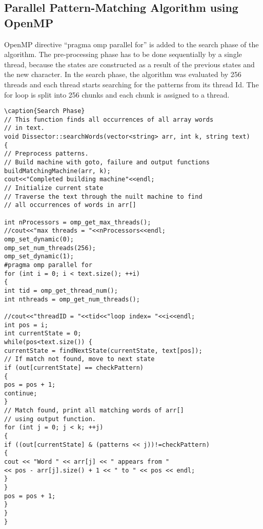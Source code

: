 \subsection{Parallel Pattern-Matching Algorithm using OpenMP}
OpenMP directive “pragma omp parallel for” is added to the search phase of the algorithm. The pre-processing phase has to be done sequentially by a single thread, because the states are constructed as a result of the previous states and the new character. In the search phase, the algorithm was evaluated by 256 threads and each thread starts searching for the patterns from its thread Id. The for loop is split into 256 chunks and each chunk is assigned to a thread. 

\begin{lstlisting}
\caption{Search Phase}
// This function finds all occurrences of all array words
// in text.
void Dissector::searchWords(vector<string> arr, int k, string text)
{
// Preprocess patterns.
// Build machine with goto, failure and output functions
buildMatchingMachine(arr, k);
cout<<"Completed building machine"<<endl;
// Initialize current state
// Traverse the text through the nuilt machine to find
// all occurrences of words in arr[]

int nProcessors = omp_get_max_threads();
//cout<<"max threads = "<<nProcessors<<endl;
omp_set_dynamic(0);
omp_set_num_threads(256);
omp_set_dynamic(1);	
#pragma omp parallel for	
for (int i = 0; i < text.size(); ++i)
{
int tid = omp_get_thread_num();
int nthreads = omp_get_num_threads();

//cout<<"threadID = "<<tid<<"loop index= "<<i<<endl;
int pos = i;
int currentState = 0;
while(pos<text.size()) {
currentState = findNextState(currentState, text[pos]);
// If match not found, move to next state
if (out[currentState] == checkPattern)
{
pos = pos + 1;
continue;
}
// Match found, print all matching words of arr[]
// using output function.
for (int j = 0; j < k; ++j)
{
if ((out[currentState] & (patterns << j))!=checkPattern)
{
cout << "Word " << arr[j] << " appears from "
<< pos - arr[j].size() + 1 << " to " << pos << endl;
}
}
pos = pos + 1;
}
}
}
\end{lstlisting}

